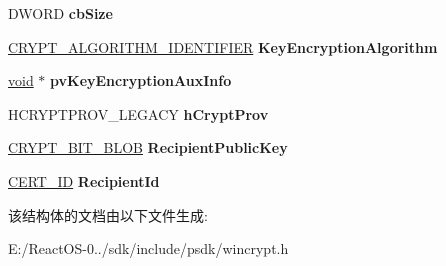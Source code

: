 \begin{DoxyCompactItemize}
\item 
\mbox{\label{struct___c_m_s_g___k_e_y___t_r_a_n_s___r_e_c_i_p_i_e_n_t___e_n_c_o_d_e___i_n_f_o_a501222dee237c4b335b7fbc7b913899b}} 
D\+W\+O\+RD {\bfseries cb\+Size}
\item 
\mbox{\label{struct___c_m_s_g___k_e_y___t_r_a_n_s___r_e_c_i_p_i_e_n_t___e_n_c_o_d_e___i_n_f_o_ae9440b40cd83b08715bbc21528ef3fc1}} 
\hyperlink{struct___c_r_y_p_t___a_l_g_o_r_i_t_h_m___i_d_e_n_t_i_f_i_e_r}{C\+R\+Y\+P\+T\+\_\+\+A\+L\+G\+O\+R\+I\+T\+H\+M\+\_\+\+I\+D\+E\+N\+T\+I\+F\+I\+ER} {\bfseries Key\+Encryption\+Algorithm}
\item 
\mbox{\label{struct___c_m_s_g___k_e_y___t_r_a_n_s___r_e_c_i_p_i_e_n_t___e_n_c_o_d_e___i_n_f_o_ae0f94c8b77044eabc8d8c57675b58e91}} 
\hyperlink{interfacevoid}{void} $\ast$ {\bfseries pv\+Key\+Encryption\+Aux\+Info}
\item 
\mbox{\label{struct___c_m_s_g___k_e_y___t_r_a_n_s___r_e_c_i_p_i_e_n_t___e_n_c_o_d_e___i_n_f_o_a95ba20409f05674438d3a93a3f6ee43e}} 
H\+C\+R\+Y\+P\+T\+P\+R\+O\+V\+\_\+\+L\+E\+G\+A\+CY {\bfseries h\+Crypt\+Prov}
\item 
\mbox{\label{struct___c_m_s_g___k_e_y___t_r_a_n_s___r_e_c_i_p_i_e_n_t___e_n_c_o_d_e___i_n_f_o_a1910c994351aca4c9442796e63d9495e}} 
\hyperlink{struct___c_r_y_p_t___b_i_t___b_l_o_b}{C\+R\+Y\+P\+T\+\_\+\+B\+I\+T\+\_\+\+B\+L\+OB} {\bfseries Recipient\+Public\+Key}
\item 
\mbox{\label{struct___c_m_s_g___k_e_y___t_r_a_n_s___r_e_c_i_p_i_e_n_t___e_n_c_o_d_e___i_n_f_o_a9ed5fe5c858e46d63abb3491b2a186ae}} 
\hyperlink{struct___c_e_r_t___i_d}{C\+E\+R\+T\+\_\+\+ID} {\bfseries Recipient\+Id}
\end{DoxyCompactItemize}


该结构体的文档由以下文件生成\+:\begin{DoxyCompactItemize}
\item 
E\+:/\+React\+O\+S-\/0../sdk/include/psdk/wincrypt.\+h\end{DoxyCompactItemize}
